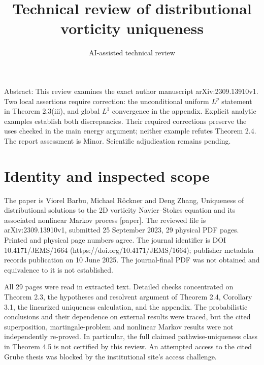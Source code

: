 \documentclass[10pt]{article}
\title{Technical review of distributional vorticity uniqueness}
\author{AI-assisted technical review}
\date{}
\begin{document}
\maketitle
Abstract: This review examines the exact author manuscript arXiv:2309.13910v1. Two local assertions require correction: the unconditional uniform \(L^p\) statement in Theorem 2.3(iii), and global \(L^1\) convergence in the appendix. Explicit analytic examples establish both discrepancies. Their required corrections preserve the uses checked in the main energy argument; neither example refutes Theorem 2.4. The report assessment is Minor. Scientific adjudication remains pending.\par
\section*{Identity and inspected scope}
The paper is Viorel Barbu, Michael Röckner and Deng Zhang, Uniqueness of distributional solutions to the 2D vorticity Navier–Stokes equation and its associated nonlinear Markov process [paper]. The reviewed file is arXiv:2309.13910v1, submitted 25 September 2023, 29 physical PDF pages. Printed and physical page numbers agree. The journal identifier is DOI 10.4171/JEMS/1664 (https://doi.org/10.4171/JEMS/1664); publisher metadata records publication on 10 June 2025. The journal-final PDF was not obtained and equivalence to it is not established.\par
All 29 pages were read in extracted text. Detailed checks concentrated on Theorem 2.3, the hypotheses and resolvent argument of Theorem 2.4, Corollary 3.1, the linearized uniqueness calculation, and the appendix. The probabilistic conclusions and their dependence on external results were traced, but the cited superposition, martingale-problem and nonlinear Markov results were not independently re-proved. In particular, the full claimed pathwise-uniqueness class in Theorem 4.5 is not certified by this review. An attempted access to the cited Grube thesis was blocked by the institutional site’s access challenge.\par
\end{document}
